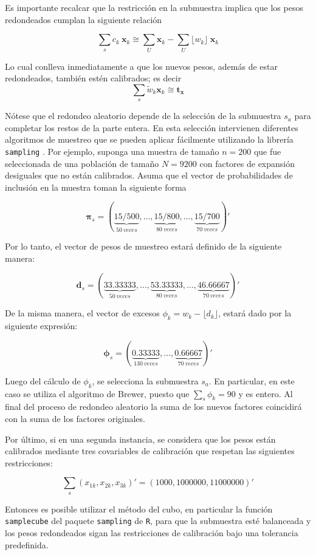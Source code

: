 \documentclass[
  10pt,
  spanish,
]{book}
\begin{document}
Es importante recalcar que la restricción en la submuestra implica que los pesos redondeados cumplan la siguiente relación

\[
\sum_s c_k \ \mathbf{x}_k 
\cong \sum_U \mathbf{x}_k 
- \sum_U \lfloor w_k \rfloor \ \mathbf{x}_k 
\]

Lo cual conlleva inmediatamente a que los nuevos pesos, además de estar redondeados, también estén calibrados; es decir
\[
\sum_s \tilde w_k \mathbf{x}_k \cong  \mathbf{t_x}
\]

Nótese que el redondeo aleatorio depende de la selección de la submuestra \(s_a\) para completar los restos de la parte entera. En esta selección intervienen diferentes algoritmos de muestreo que se pueden aplicar fácilmente utilizando la librería \texttt{sampling} \citep{Matei}. Por ejemplo, suponga una muestra de tamaño \(n= 200\) que fue seleccionada de una población de tamaño \(N=9200\) con factores de expansión desiguales que no están calibrados. Asuma que el vector de probabilidades de inclusión en la muestra toman la siguiente forma

\[
\boldsymbol{\pi}_s = (\underbrace{15/500}_{50 \ veces},
\ldots,
\underbrace{15/800}_{80 \ veces}, 
\ldots,
\underbrace{15/700}_{70 \ veces})'
\]

Por lo tanto, el vector de pesos de muestreo estará definido de la siguiente manera:

\[
\mathbf{d}_s = (\underbrace{33.33333}_{50 \ veces},
\ldots,
\underbrace{53.33333}_{80 \ veces}, 
\ldots,
\underbrace{46.66667}_{70 \ veces})'
\]

De la misma manera, el vector de excesos \(\phi_k = w_k - \lfloor d_k \rfloor\), estará dado por la siguiente expresión:

\[
\boldsymbol{\phi}_s = (\underbrace{0.33333}_{130 \ veces},
\ldots,
\underbrace{0.66667}_{70 \ veces})'
\]

Luego del cálculo de \(\phi_k\), se selecciona la submuestra \(s_a\). En particular, en este caso se utiliza el algoritmo de Brewer, puesto que \(\sum_s\phi_k = 90\) y es entero. Al final del proceso de redondeo aleatorio la suma de los nuevos factores coincidirá con la suma de los factores originales.

Por último, si en una segunda instancia, se considera que los pesos están calibrados mediante tres covariables de calibración que respetan las siguientes restricciones:

\[
\sum_{s} (x_{1k}, x_{2k}, x_{3k})' = (1000, 1000000, 11000000)'
\]

Entonces es posible utilizar el método del cubo, en particular la función \texttt{samplecube} del paquete \texttt{sampling} de \texttt{R}, para que la submuestra esté balanceada y los pesos redondeados sigan las restricciones de calibración bajo una tolerancia predefinida.
\end{document}
